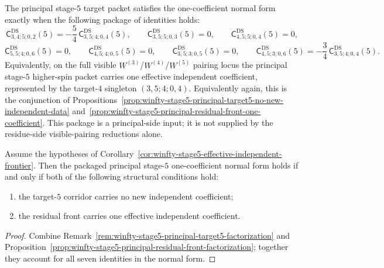 \begin{proposition}
\label{prop:winfty-stage5-principal-one-coefficient-normal-form}
\ClaimStatusConditional{}
The principal stage-$5$ target packet satisfies the one-coefficient
normal form exactly when the following package of identities holds:
\[
\mathsf{C}^{\mathrm{DS}}_{3,4;5;0,2}(5)
=
-\frac{5}{4}\,\mathsf{C}^{\mathrm{DS}}_{3,5;4;0,4}(5),
\qquad
\mathsf{C}^{\mathrm{DS}}_{3,5;5;0,3}(5)=0,
\qquad
\mathsf{C}^{\mathrm{DS}}_{4,5;5;0,4}(5)=0,
\]
\[
\mathsf{C}^{\mathrm{DS}}_{5,5;4;0,6}(5)=0,
\qquad
\mathsf{C}^{\mathrm{DS}}_{4,5;4;0,5}(5)=0,
\qquad
\mathsf{C}^{\mathrm{DS}}_{3,5;3;0,5}(5)=0,
\qquad
\mathsf{C}^{\mathrm{DS}}_{4,5;3;0,6}(5)
=
-\frac{3}{4}\,\mathsf{C}^{\mathrm{DS}}_{3,5;4;0,4}(5).
\]
Equivalently, on the full visible
\texorpdfstring{$W^{(3)}$}{W3}/\texorpdfstring{$W^{(4)}$}{W4}/\texorpdfstring{$W^{(5)}$}{W5}
pairing locus the principal stage-$5$ higher-spin packet carries one
effective independent coefficient, represented by the target-$4$
singleton \((3,5;4;0,4)\). Equivalently again, this is the conjunction
of
Propositions~\ref{prop:winfty-stage5-principal-target5-no-new-independent-data}
and~\ref{prop:winfty-stage5-principal-residual-front-one-coefficient}.
This package is a principal-side input; it is not supplied by the
residue-side visible-pairing reductions alone.
\end{proposition}

\begin{proposition}
\label{prop:winfty-stage5-principal-one-coefficient-factorization}
Assume the hypotheses of
Corollary~\ref{cor:winfty-stage5-effective-independent-frontier}. Then
the packaged principal stage-$5$ one-coefficient normal form holds if
and only if both of the following structural conditions hold:
\begin{enumerate}[label=\textup{(\roman*)}]
\item the target-$5$ corridor carries no new independent coefficient;
\item the residual front carries one effective independent
 coefficient.
\end{enumerate}
\end{proposition}

\begin{proof}
Combine Remark~\ref{rem:winfty-stage5-principal-target5-factorization} and Proposition~\ref{prop:winfty-stage5-principal-residual-front-factorization}; together they account for all seven identities in the normal form.
\end{proof}

